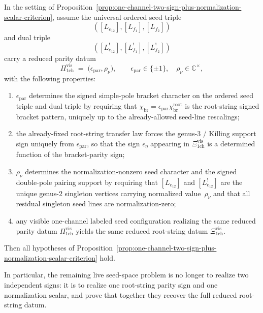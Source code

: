 \begin{proposition}\label{prop:one-channel-parity-sign-plus-normalization-scalar-criterion}
In the setting of
Proposition~\textup{\ref{prop:one-channel-two-sign-plus-normalization-scalar-criterion}},
assume the universal ordered seed triple
\[
([L_{e_{12}}],[L_{f_1}],[L_{f_2}])
\]
and dual triple
\[
([L_{e_{12}}^!],[L_{f_1}^!],[L_{f_2}^!])
\]
carry a reduced parity datum
\[
\Pi_{\mathrm{1ch}}^{\mathrm{vis}}
\;=\;
\bigl(\epsilon_{\mathrm{par}},\rho_{\nu}\bigr),
\qquad
\epsilon_{\mathrm{par}}\in\{\pm 1\},
\quad
\rho_{\nu}\in\mathbb{C}^\times,
\]
with the following properties:
\begin{enumerate}[label=\textup{(\roman*)}]
\item $\epsilon_{\mathrm{par}}$ determines the signed simple-pole
  bracket character on the ordered seed triple and dual triple by
  requiring that
  $\chi_{\mathrm{br}}=\epsilon_{\mathrm{par}}\chi_{\mathrm{br}}^{\mathrm{root}}$
  is the root-string signed bracket pattern, uniquely up to the
  already-allowed seed-line rescalings;
\item the already-fixed root-string transfer law forces the genus-$3$
  / Killing support sign uniquely from
  $\epsilon_{\mathrm{par}}$, so that the sign
  $\epsilon_{\eta}$ appearing in
  $\Xi_{\mathrm{1ch}}^{\mathrm{vis}}$
  is a determined function of the bracket-parity sign;
\item $\rho_{\nu}$ determines the normalization-nonzero seed character
  and the signed double-pole pairing support by requiring that
  $[L_{e_{12}}]$ and $[L_{e_{12}}^!]$ are the unique genus-$2$
  singleton vertices carrying normalized value~$\rho_{\nu}$ and that
  all residual singleton seed lines are normalization-zero;
\item any visible one-channel labeled seed configuration realizing the
  same reduced parity datum
  $\Pi_{\mathrm{1ch}}^{\mathrm{vis}}$
  yields the same reduced root-string datum
  $\Xi_{\mathrm{1ch}}^{\mathrm{vis}}$.
\end{enumerate}
Then all hypotheses of
Proposition~\ref{prop:one-channel-two-sign-plus-normalization-scalar-criterion}
hold.

In particular, the remaining live seed-space problem is no longer to
realize two independent signs: it is to realize one root-string parity
sign and one normalization scalar, and prove that together they recover
the full reduced root-string datum.
\end{proposition}

